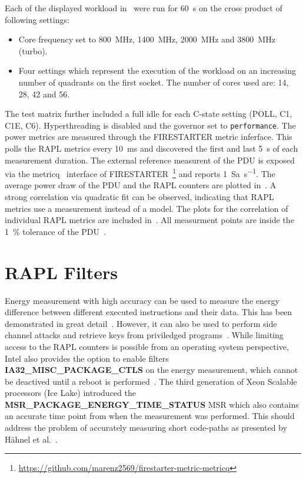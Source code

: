 Each of the displayed workload in~ were run for \SI{60}{\second} on the cross product of following settings:
\begin{itemize}
    \item Core frequency set to \SI{800}{\MHz}, \SI{1400}{\MHz}, \SI{2000}{\MHz} and \SI{3800}{\MHz} (turbo).
    \item Four settings which represent the execution of the workload on an increasing number of quadrants on the first socket.
    The number of cores used are: \SI{14}{}, \SI{28}{}, \SI{42}{} and \SI{56}{}.
\end{itemize}
The test matrix further included a full idle for each C-state setting (POLL, C1, C1E, C6).
Hyperthreading is disabled and the governor set to \texttt{performance}.
The power metrics are measured through the FIRESTARTER metric inferface.
This polls the RAPL metrics every \SI{10}{\ms} and discovered the first and last \SI{5}{\second} of each measurement duration.
The external reference measurent of the PDU is exposed via the metricq~\cite{Ilsche_2019_MetricQ} interface of FIRESTARTER~\footnote{\url{https://github.com/marenz2569/firestarter-metric-metricq}} and reports \SI{1}{Sa\per\second}.
The average power draw of the PDU and the RAPL counters are plotted in~.
A strong correlation via quadratic fit can be observed, indicating that RAPL metrics use a measurement instead of a model.
The plots for the correlation of individual RAPL metrics are included in~.
All measurment points are inside the \SI{1}{\percent} tolerance of the PDU~\cite{Raritan_PX2_5528}.

\section{RAPL Filters}

Energy measurement with high accuracy can be used to measure the energy difference between different executed instructions and their data.
This has been demonstrated in great detail~\cite{Lucas_2016_AluPower,Schoene_2024_Alder_Lake,Schoene_2021_Zen2}.
However, it can also be used to perform side channel attacks and retrieve keys from priviledged programs~\cite{Lipp_2021_Platypus}.
While limiting access to the RAPL counters is possible from an operating system perspective, Intel also provides the option to enable filters \textbf{IA32\_MISC\_PACKAGE\_CTLS} on the energy measurement, which cannot be deactived until a reboot is performed~\cite[Vol. 4 Table 2-52]{intel_combined_software_developer_manual}.
The third generation of Xeon Scalable processors (Ice Lake) introduced the \textbf{MSR\_PACKAGE\_ENERGY\_TIME\_STATUS} MSR which also contains an accurate time point from when the measurement was performed.
This should address the problem of accurately measuring short code-paths as presented by Hähnel et al.~\cite{Haehnel_2012_RAPL}.

